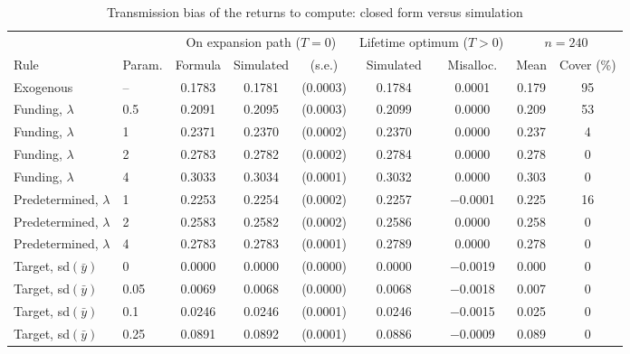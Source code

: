 \begin{table}[!htbp]
\centering
\begin{threeparttable}
\caption{Transmission bias of the returns to compute: closed form versus simulation}
\label{tab:mc_transmission}
\small
\begin{tabular}{llccccccc}
\toprule
 & & \multicolumn{3}{c}{On expansion path ($T=0$)} & \multicolumn{2}{c}{Lifetime optimum ($T>0$)} & \multicolumn{2}{c}{$n=240$} \\
\cmidrule(lr){3-5}\cmidrule(lr){6-7}\cmidrule(lr){8-9}
Rule & Param. & Formula & Simulated & (s.e.) & Simulated & Misalloc. & Mean & Cover (\%) \\
\midrule
Exogenous & -- & 0.1783 & 0.1781 & (0.0003) & 0.1784 & 0.0001 & 0.179 & 95 \\
Funding, $\lambda$ & 0.5 & 0.2091 & 0.2095 & (0.0003) & 0.2099 & 0.0000 & 0.209 & 53 \\
Funding, $\lambda$ & 1 & 0.2371 & 0.2370 & (0.0002) & 0.2370 & 0.0000 & 0.237 & 4 \\
Funding, $\lambda$ & 2 & 0.2783 & 0.2782 & (0.0002) & 0.2784 & 0.0000 & 0.278 & 0 \\
Funding, $\lambda$ & 4 & 0.3033 & 0.3034 & (0.0001) & 0.3032 & 0.0000 & 0.303 & 0 \\
Predetermined, $\lambda$ & 1 & 0.2253 & 0.2254 & (0.0002) & 0.2257 & $-$0.0001 & 0.225 & 16 \\
Predetermined, $\lambda$ & 2 & 0.2583 & 0.2582 & (0.0002) & 0.2586 & 0.0000 & 0.258 & 0 \\
Predetermined, $\lambda$ & 4 & 0.2783 & 0.2783 & (0.0001) & 0.2789 & 0.0000 & 0.278 & 0 \\
Target, sd$(\bar y)$ & 0 & 0.0000 & 0.0000 & (0.0000) & 0.0000 & $-$0.0019 & 0.000 & 0 \\
Target, sd$(\bar y)$ & 0.05 & 0.0069 & 0.0068 & (0.0000) & 0.0068 & $-$0.0018 & 0.007 & 0 \\
Target, sd$(\bar y)$ & 0.1 & 0.0246 & 0.0246 & (0.0001) & 0.0246 & $-$0.0015 & 0.025 & 0 \\
Target, sd$(\bar y)$ & 0.25 & 0.0891 & 0.0892 & (0.0001) & 0.0886 & $-$0.0009 & 0.089 & 0 \\
\bottomrule
\end{tabular}
\begin{tablenotes}[flushleft]\footnotesize

\end{tablenotes}
\end{threeparttable}
\end{table}
